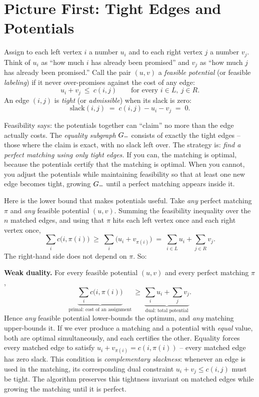 \section{Picture First: Tight Edges and Potentials}
\label{ch16:potentials}

Assign to each left vertex $i$ a number $u_i$ and to each right vertex $j$ a number $v_j$. Think of $u_i$ as ``how much $i$ has already been promised'' and $v_j$ as ``how much $j$ has already been promised.'' Call the pair $(u,v)$ a \emph{feasible potential} (or feasible \emph{labeling}) if it never over-promises against the cost of any edge:
\[
  u_i + v_j \ \le\ c(i,j)\qquad\text{for every } i\in L,\ j\in R.
\]
An edge $(i,j)$ is \emph{tight} (or \emph{admissible}) when its slack is zero:
\[
  \mathrm{slack}(i,j) \;=\; c(i,j) - u_i - v_j \;=\; 0.
\]

\begin{intuitionbox}
Feasibility says: the potentials together can ``claim'' no more than the edge actually costs. The \emph{equality subgraph} $G_=$ consists of exactly the tight edges -- those where the claim is exact, with no slack left over. The strategy is: \emph{find a perfect matching using only tight edges.} If you can, the matching is optimal, because the potentials certify that the matching is optimal. When you cannot, you adjust the potentials while maintaining feasibility so that at least one new edge becomes tight, growing $G_=$ until a perfect matching appears inside it.
\end{intuitionbox}

Here is the lower bound that makes potentials useful. Take \emph{any} perfect matching $\pi$ and \emph{any} feasible potential $(u,v)$. Summing the feasibility inequality over the $n$ matched edges, and using that $\pi$ hits each left vertex once and each right vertex once,
\[
  \sum_{i} c\bigl(i,\pi(i)\bigr)
  \;\ge\; \sum_i \bigl(u_i + v_{\pi(i)}\bigr)
  \;=\; \sum_{i\in L} u_i + \sum_{j\in R} v_j .
\]
The right-hand side does not depend on $\pi$. So:

\begin{whybox}
\textbf{Weak duality.} For every feasible potential $(u,v)$ and every perfect matching $\pi$,
\[
  \underbrace{\sum_{i} c\bigl(i,\pi(i)\bigr)}_{\text{primal: cost of an assignment}}
  \ \ge\
  \underbrace{\sum_i u_i + \sum_j v_j}_{\text{dual: total potential}}.
\]
Hence \emph{any} feasible potential lower-bounds the optimum, and \emph{any} matching upper-bounds it. If we ever produce a matching and a potential with \emph{equal} value, both are optimal simultaneously, and each certifies the other. Equality forces every matched edge to satisfy $u_i+v_{\pi(i)}=c(i,\pi(i))$ -- every matched edge has zero slack. This condition is \emph{complementary slackness}: whenever an edge is used in the matching, its corresponding dual constraint $u_i + v_j \le c(i,j)$ must be tight. The algorithm preserves this tightness invariant on matched edges while growing the matching until it is perfect.
\end{whybox}

